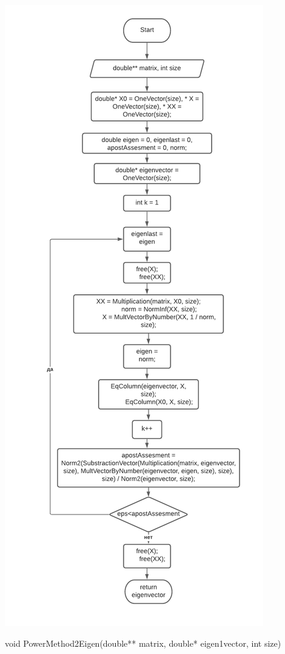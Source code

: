 \includegraphics[scale=0.6]{block10.pdf}

void PowerMethod2Eigen(double** matrix, double* eigen1vector, int size)

